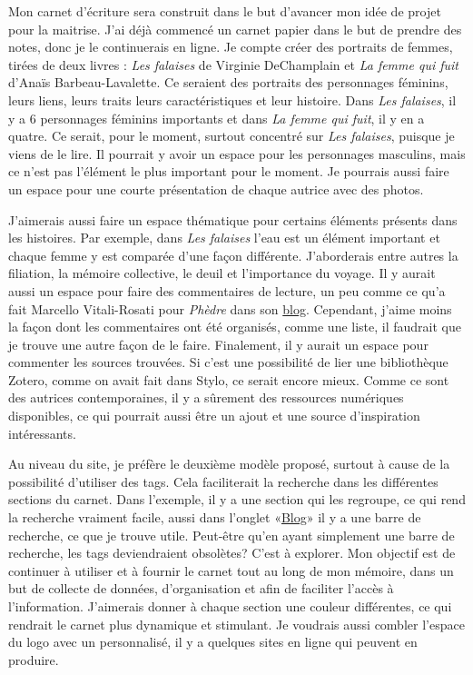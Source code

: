 \documentclass[12pt,french,letterpaper]{article}
\begin{document}
\normalsize{Mon carnet d'écriture sera construit dans le but d'avancer
mon idée de projet pour la maitrise. J'ai déjà commencé un carnet papier
dans le but de prendre des notes, donc je le continuerais en ligne. Je
compte créer des portraits de femmes, tirées de deux livres : \emph{Les
falaises} de Virginie DeChamplain et \emph{La femme qui fuit} d'Anaïs
Barbeau-Lavalette. Ce seraient des portraits des personnages féminins,
leurs liens, leurs traits leurs caractéristiques et leur histoire. Dans
\emph{Les falaises}, il y a 6 personnages féminins importants et dans
\emph{La femme qui fuit}, il y en a quatre. Ce serait, pour le moment,
surtout concentré sur \emph{Les falaises}, puisque je viens de le lire.
Il pourrait y avoir un espace pour les personnages masculins, mais ce
n'est pas l'élément le plus important pour le moment. Je pourrais aussi
faire un espace pour une courte présentation de chaque autrice avec des
photos.

J'aimerais aussi faire un espace thématique pour certains éléments
présents dans les histoires. Par exemple, dans \emph{Les falaises} l'eau
est un élément important et chaque femme y est comparée d'une façon
différente. J'aborderais entre autres la filiation, la mémoire
collective, le deuil et l'importance du voyage. Il y aurait aussi un
espace pour faire des commentaires de lecture, un peu comme ce qu'a fait
Marcello Vitali-Rosati pour \emph{Phèdre} dans son
\href{http://blog.sens-public.org/marcellovitalirosati/categories/scholia/}{blog}.
Cependant, j'aime moins la façon dont les commentaires ont été
organisés, comme une liste, il faudrait que je trouve une autre façon de
le faire. Finalement, il y aurait un espace pour commenter les sources
trouvées. Si c'est une possibilité de lier une bibliothèque Zotero,
comme on avait fait dans Stylo, ce serait encore mieux. Comme ce sont
des autrices contemporaines, il y a sûrement des ressources numériques
disponibles, ce qui pourrait aussi être un ajout et une source
d'inspiration intéressants.

Au niveau du site, je préfère le deuxième modèle proposé, surtout à
cause de la possibilité d'utiliser des tags. Cela faciliterait la
recherche dans les différentes sections du carnet. Dans l'exemple, il y
a une section qui les regroupe, ce qui rend la recherche vraiment
facile, aussi dans l'onglet
«\href{https://cupper-hugo-theme.netlify.app/post/}{Blog}» il y a une
barre de recherche, ce que je trouve utile. Peut-être qu'en ayant
simplement une barre de recherche, les tags deviendraient obsolètes?
C'est à explorer. Mon objectif est de continuer à utiliser et à fournir
le carnet tout au long de mon mémoire, dans un but de collecte de
données, d'organisation et afin de faciliter l'accès à l'information.
J'aimerais donner à chaque section une couleur différentes, ce qui
rendrait le carnet plus dynamique et stimulant. Je voudrais aussi
combler l'espace du logo avec un personnalisé, il y a quelques sites en
ligne qui peuvent en produire.}
\end{document}
